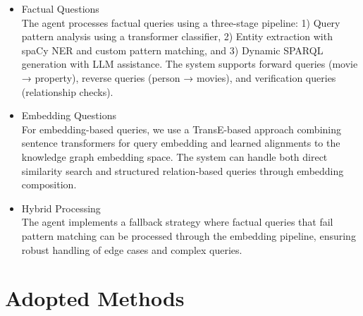 \documentclass{article}
\begin{document}
\begin{itemize}
    \item Factual Questions \\
    The agent processes factual queries using a three-stage pipeline: 1) Query pattern analysis using a transformer classifier, 2) Entity extraction with spaCy NER and custom pattern matching, and 3) Dynamic SPARQL generation with LLM assistance. The system supports forward queries (movie → property), reverse queries (person → movies), and verification queries (relationship checks).

    \item Embedding Questions \\
    For embedding-based queries, we use a TransE-based approach combining sentence transformers for query embedding and learned alignments to the knowledge graph embedding space. The system can handle both direct similarity search and structured relation-based queries through embedding composition.

    \item Hybrid Processing \\
    The agent implements a fallback strategy where factual queries that fail pattern matching can be processed through the embedding pipeline, ensuring robust handling of edge cases and complex queries.
\end{itemize}

\section{Adopted Methods}
\end{document}
